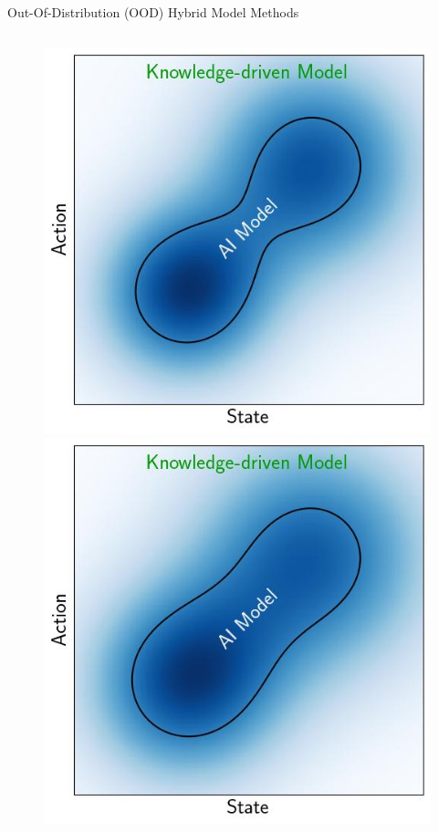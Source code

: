 \documentclass[lecture]{beamer}
\begin{document}
\begin{frame}{\normalsize Out-Of-Distribution (OOD) Hybrid Model Methods}
\begin{columns}
\begin{overlayarea}{\textwidth}{0.5\textheight}
\begin{figure}
        {%
         \includegraphics[width=\FS\textwidth,clip]{Codes/Epistemic/Hybrid4.jpeg}
        }
        {%
         \includegraphics[width=\FS\textwidth,clip]{Codes/Epistemic/Hybrid3.jpeg}
}
\end{figure}
\end{overlayarea}
\end{columns}
\end{frame}
\end{document}
